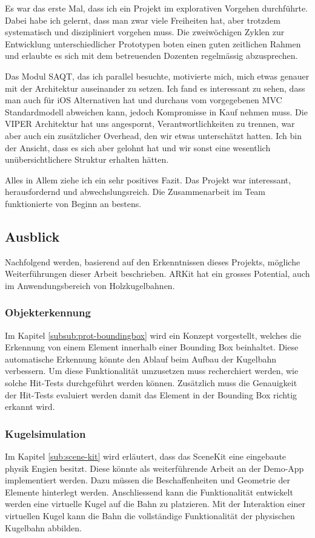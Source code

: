 Es war das erste Mal, dass ich ein Projekt im explorativen Vorgehen durchführte.
Dabei habe ich gelernt, dass man zwar viele Freiheiten hat, aber trotzdem systematisch und diszipliniert vorgehen muss.
Die zweiwöchigen Zyklen zur Entwicklung unterschiedlicher Prototypen boten einen guten zeitlichen Rahmen und erlaubte es sich mit dem betreuenden Dozenten regelmässig abzusprechen.

Das Modul SAQT, das ich parallel besuchte, motivierte mich, mich etwas genauer mit der Architektur auseinander zu setzen.
Ich fand es interessant zu sehen, dass man auch für iOS Alternativen hat und durchaus vom vorgegebenen MVC Standardmodell abweichen kann, jedoch Kompromisse in Kauf nehmen muss.
Die VIPER Architektur hat uns angespornt, Verantwortlichkeiten zu trennen, war aber auch ein zusätzlicher Overhead, den wir etwas unterschätzt hatten.
Ich bin der Ansicht, dass es sich aber gelohnt hat und wir sonst eine wesentlich unübersichtlichere Struktur erhalten hätten.

Alles in Allem ziehe ich ein sehr positives Fazit.
Das Projekt war interessant, herausfordernd und abwechslungsreich.
Die Zusammenarbeit im Team funktionierte von Beginn an bestens.

\subsection{Ausblick}

Nachfolgend werden, basierend auf den Erkenntnissen dieses Projekts, mögliche Weiterführungen dieser Arbeit beschrieben.
ARKit hat ein grosses Potential, auch im Anwendungsbereich von Holzkugelbahnen.

\subsubsection{Objekterkennung}
Im Kapitel \ref{subsub:prot-boundingbox} wird ein Konzept vorgestellt, welches die Erkennung von einem Element innerhalb einer Bounding Box beinhaltet. Diese automatische Erkennung könnte den Ablauf beim Aufbau der Kugelbahn verbessern. Um diese Funktionalität umzusetzen muss recherchiert werden, wie solche Hit-Tests durchgeführt werden können. Zusätzlich muss die Genauigkeit der Hit-Tests evaluiert werden damit das Element in der Bounding Box richtig erkannt wird.

\subsubsection{Kugelsimulation}
Im Kapitel \ref{sub:scene-kit} wird erläutert, dass das SceneKit eine eingebaute physik Engien besitzt. Diese könnte als weiterführende Arbeit an der Demo-App implementiert werden. Dazu müssen die Beschaffenheiten und Geometrie der Elemente hinterlegt werden. Anschliessend kann die Funktionalität entwickelt werden eine virtuelle Kugel auf die Bahn zu platzieren. Mit der Interaktion einer virtuellen Kugel kann die Bahn die vollständige Funktionalität der physischen Kugelbahn abbilden.

